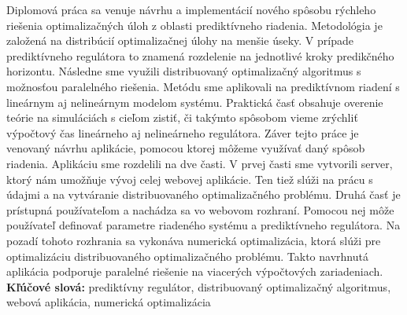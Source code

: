 Diplomová práca sa venuje návrhu a implementácií nového spôsobu rýchleho riešenia optimalizačných úloh z oblasti prediktívneho riadenia. Metodológia je založená na distribúcií optimalizačnej úlohy na menšie úseky. V prípade prediktívneho regulátora to znamená rozdelenie na jednotlivé kroky predikčného horizontu. Následne sme využili distribuovaný optimalizačný algoritmus s možnosťou paralelného riešenia. Metódu sme aplikovali na prediktívnom riadení s lineárnym aj nelineárnym modelom systému. Praktická časť obsahuje overenie teórie na simuláciách s cieľom zistiť, či takýmto spôsobom vieme zrýchliť výpočtový čas lineárneho aj nelineárneho regulátora. Záver tejto práce je venovaný návrhu aplikácie, pomocou ktorej môžeme využívať daný spôsob riadenia. Aplikáciu sme rozdelili na dve časti. V prvej časti sme vytvorili server, ktorý nám umožňuje vývoj celej webovej aplikácie. Ten tiež slúži na prácu s údajmi a na vytváranie distribuovaného optimalizačného problému. Druhá časť je prístupná používateľom a nachádza sa vo webovom rozhraní. Pomocou nej môže používateľ definovať parametre riadeného systému a prediktívneho regulátora. Na pozadí tohoto rozhrania sa vykonáva numerická optimalizácia, ktorá slúži pre optimalizáciu distribuovaného optimalizačného problému. Takto navrhnutá aplikácia podporuje paralelné riešenie na viacerých výpočtových zariadeniach. \\
\textbf{Kľúčové slová:} prediktívny regulátor, distribuovaný optimalizačný algoritmus, webová aplikácia, numerická optimalizácia